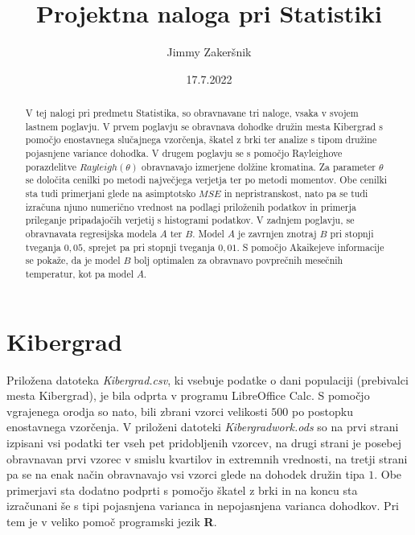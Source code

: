 \documentclass[a4paper, 10pt]{article}
\title{Projektna naloga pri Statistiki}
\date{17.7.2022}
\author{Jimmy Zakeršnik}
\begin{document}
	\maketitle
	\thispagestyle{empty}
	\newpage
	\begin{abstract}
		V tej nalogi pri predmetu Statistika, so obravnavane tri naloge, vsaka v svojem lastnem poglavju. V prvem poglavju se obravnava dohodke družin mesta Kibergrad s pomočjo enostavnega slučajnega vzorčenja, škatel z brki ter analize s tipom družine pojasnjene variance dohodka. V drugem poglavju se s pomočjo Rayleighove porazdelitve $Rayleigh(\theta)$ obravnavajo izmerjene dolžine kromatina. Za parameter $\theta$ se določita cenilki po metodi največjega verjetja ter po metodi momentov. Obe cenilki sta tudi primerjani glede na asimptotsko $MSE$ in nepristranskost, nato pa se tudi izračuna njuno numerično vrednost na podlagi priloženih podatkov in primerja prileganje pripadajočih verjetij s histogrami podatkov. V zadnjem poglavju, se obravnavata regresijska modela $A$ ter $B$. Model $A$ je zavrnjen znotraj $B$ pri stopnji tveganja $0{,}05$, sprejet pa pri stopnji tveganja $0{,}01$. S pomočjo Akaikejeve informacije se pokaže, da je model $B$ bolj optimalen za obravnavo povprečnih mesečnih temperatur, kot pa model $A$.
	\end{abstract}
	\newpage
	\tableofcontents
	\newpage
	\section{Kibergrad}\label{sect: Kibergrad}
	Priložena datoteka \textit{Kibergrad.csv}, ki vsebuje podatke o dani populaciji (prebivalci mesta Kibergrad), je bila odprta v programu LibreOffice Calc. S pomočjo vgrajenega orodja so nato, bili zbrani vzorci velikosti $500$ po postopku enostavnega vzorčenja. V priloženi datoteki \textit{Kibergradwork.ods} so na prvi strani izpisani vsi podatki ter vseh pet pridobljenih vzorcev, na drugi strani je posebej obravnavan prvi vzorec v smislu kvartilov in extremnih vrednosti, na tretji strani pa se na enak način obravnavajo vsi vzorci glede na dohodek družin tipa $1$. Obe primerjavi sta dodatno podprti s pomočjo škatel z brki in na koncu sta izračunani še s tipi pojasnjena varianca in nepojasnjena varianca dohodkov. Pri tem je v veliko pomoč programski jezik \textbf{R}.
	
\end{document}
